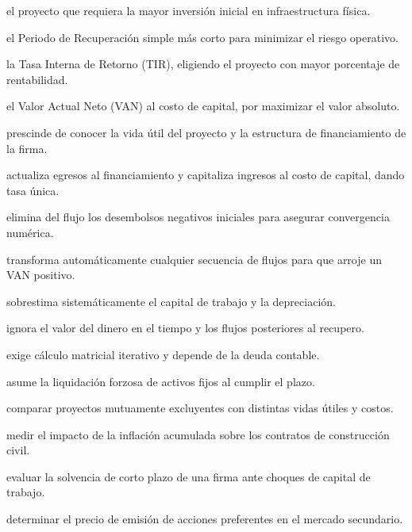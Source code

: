 \begin{opts}
    \item el proyecto que requiera la mayor inversión inicial en infraestructura física.
    \item el Periodo de Recuperación simple más corto para minimizar el riesgo operativo.
    \item la Tasa Interna de Retorno (TIR), eligiendo el proyecto con mayor porcentaje de rentabilidad.
    \item el Valor Actual Neto (VAN) al costo de capital, por maximizar el valor absoluto.
\end{opts}

\begin{opts}
    \item prescinde de conocer la vida útil del proyecto y la estructura de financiamiento de la firma.
    \item actualiza egresos al financiamiento y capitaliza ingresos al costo de capital, dando tasa única.
    \item elimina del flujo los desembolsos negativos iniciales para asegurar convergencia numérica.
    \item transforma automáticamente cualquier secuencia de flujos para que arroje un VAN positivo.
\end{opts}

\begin{opts}
    \item sobrestima sistemáticamente el capital de trabajo y la depreciación.
    \item ignora el valor del dinero en el tiempo y los flujos posteriores al recupero.
    \item exige cálculo matricial iterativo y depende de la deuda contable.
    \item asume la liquidación forzosa de activos fijos al cumplir el plazo.
\end{opts}

\begin{opts}
    \item comparar proyectos mutuamente excluyentes con distintas vidas útiles y costos.
    \item medir el impacto de la inflación acumulada sobre los contratos de construcción civil.
    \item evaluar la solvencia de corto plazo de una firma ante choques de capital de trabajo.
    \item determinar el precio de emisión de acciones preferentes en el mercado secundario.
\end{opts}

